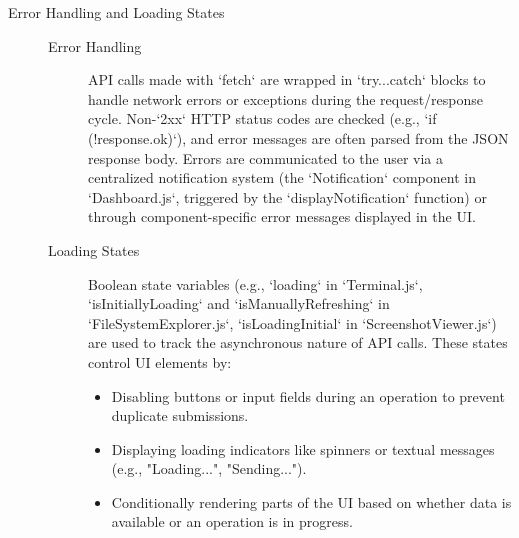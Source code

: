 \begin{description}
    \item[Error Handling and Loading States]
    \begin{description}
        \item[Error Handling] API calls made with `fetch` are wrapped in `try...catch` blocks to handle network errors or exceptions during the request/response cycle. Non-`2xx` HTTP status codes are checked (e.g., `if (!response.ok)`), and error messages are often parsed from the JSON response body. Errors are communicated to the user via a centralized notification system (the `Notification` component in `Dashboard.js`, triggered by the `displayNotification` function) or through component-specific error messages displayed in the UI.
        \item[Loading States] Boolean state variables (e.g., `loading` in `Terminal.js`, `isInitiallyLoading` and `isManuallyRefreshing` in `FileSystemExplorer.js`, `isLoadingInitial` in `ScreenshotViewer.js`) are used to track the asynchronous nature of API calls. These states control UI elements by:
            \begin{itemize}
                \item Disabling buttons or input fields during an operation to prevent duplicate submissions.
                \item Displaying loading indicators like spinners or textual messages (e.g., "Loading...", "Sending...").
                \item Conditionally rendering parts of the UI based on whether data is available or an operation is in progress.
            \end{itemize}
    \end{description}
\end{description}

